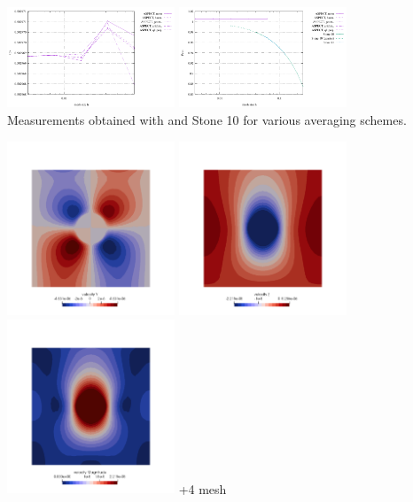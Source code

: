 \begin{center}
\includegraphics[width=5cm]{images/stokes_sphere3D/pressure_mean_OT}
\includegraphics[width=5cm]{images/stokes_sphere3D/pressure_max_OT}\\
{\captionfont Measurements obtained with \aspect and Stone 10 for various averaging schemes.}
\end{center}


\begin{center}
\includegraphics[width=5cm]{images/stokes_sphere3D/aspect_amr_OT/v}
\includegraphics[width=5cm]{images/stokes_sphere3D/aspect_amr_OT/w}
\includegraphics[width=5cm]{images/stokes_sphere3D/aspect_amr_OT/vel}
{+4 mesh}
\end{center}

